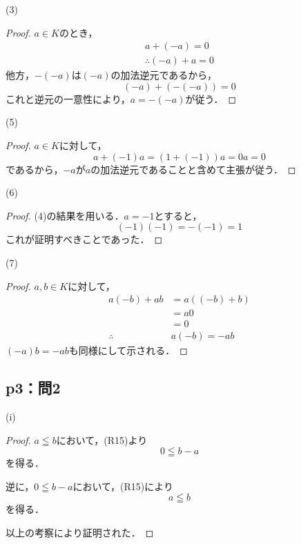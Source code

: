 \documentclass[a4paper,10pt,fleqn]{ltjsarticle}
\begin{document}
    \begin{itembox}[c]{(3)}
        \begin{proof}
$a \in K$のとき，
\begin{gather*}
    a+(-a)=0 \\
    \therefore (-a)+a =0
\end{gather*}
他方，$-(-a)$は$(-a)$の加法逆元であるから，
\[
    (-a)+(-(-a))=0
\]
これと逆元の一意性により，$a=-(-a)$が従う．
\end{proof}
\end{itembox}
\begin{itembox}[c]{(5)}
    \begin{proof}
    $a \in K$に対して，
    \[
        a+(-1)a=(1+(-1))a =0a =0
    \]
    であるから，$-a$が$a$の加法逆元であることと含めて主張が従う．
    \end{proof}
\end{itembox}
\newpage 
\begin{itembox}[c]{(6)}
    \begin{proof}
    (4)の結果を用いる．$a=-1$とすると，
    \[
        (-1)(-1)=-(-1)=1
    \]
    これが証明すべきことであった．
    \end{proof}
\end{itembox}
\begin{itembox}[c]{(7)}
    \begin{proof}
    $a,b \in K$に対して，
    \begin{align*}
     a(-b)+ab & = a((-b)+b) \\
     & = a0 \\
    & =0 \\
\therefore \quad & a(-b)=-ab 
    \end{align*}
$(-a)b = -ab$も同様にして示される．
\end{proof}
\end{itembox}
%
\newpage\subsection*{p3：問2}

\begin{itembox}[c]{(i)}
    \begin{proof}
        $a \leqq b$において，(R15)より
        \[
            0 \leqq b-a
        \]
        を得る．

        逆に，$0 \leqq b-a$において，(R15)により
        \[
            a \leqq b 
        \]
        を得る．

        以上の考察により証明された．
    \end{proof}
    \end{itembox}
\end{document}
